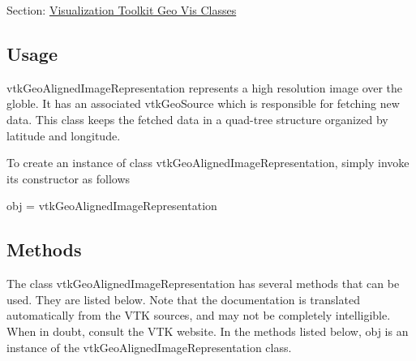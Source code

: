 Section\-: \hyperlink{sec_vtkgeovis}{Visualization Toolkit Geo Vis Classes} \hypertarget{vtkwidgets_vtkxyplotwidget_Usage}{}\subsection{Usage}\label{vtkwidgets_vtkxyplotwidget_Usage}
vtk\-Geo\-Aligned\-Image\-Representation represents a high resolution image over the globle. It has an associated vtk\-Geo\-Source which is responsible for fetching new data. This class keeps the fetched data in a quad-\/tree structure organized by latitude and longitude.

To create an instance of class vtk\-Geo\-Aligned\-Image\-Representation, simply invoke its constructor as follows \begin{DoxyVerb}  obj = vtkGeoAlignedImageRepresentation
\end{DoxyVerb}
 \hypertarget{vtkwidgets_vtkxyplotwidget_Methods}{}\subsection{Methods}\label{vtkwidgets_vtkxyplotwidget_Methods}
The class vtk\-Geo\-Aligned\-Image\-Representation has several methods that can be used. They are listed below. Note that the documentation is translated automatically from the V\-T\-K sources, and may not be completely intelligible. When in doubt, consult the V\-T\-K website. In the methods listed below, {\ttfamily obj} is an instance of the vtk\-Geo\-Aligned\-Image\-Representation class. 
